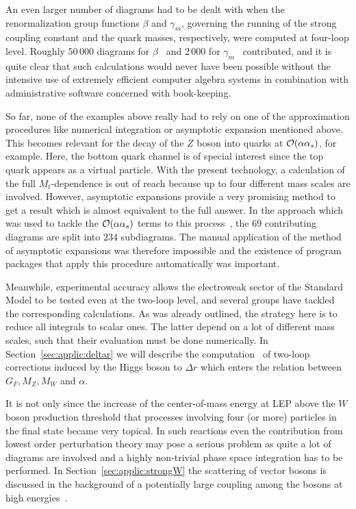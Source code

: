 An even larger number of diagrams had to be dealt with when the
renormalization group functions $\beta$ and $\gamma_m$, governing the
running of the strong coupling constant and the quark masses,
respectively, were computed at four-loop level.  Roughly $50\,000$
diagrams for $\beta$~\cite{RitVerLar97}
and $2\,000$ for 
$\gamma_m$~\cite{Che97VerLarRit97}
contributed, and it is
quite clear that such calculations would never have been possible
without the intensive use of extremely efficient computer algebra
systems in combination with administrative software concerned with
book-keeping.

So far, none of the examples above really had to rely on one of the
approximation procedures like numerical integration or asymptotic
expansion mentioned above. This becomes relevant for the decay of the
$Z$ boson into quarks at ${\cal O}(\alpha\alpha_s)$, for example. Here,
the bottom quark channel is of special interest since the top quark
appears as a virtual particle.  With the present technology, a
calculation of the full $M_t$-dependence is out of reach because up to
four different mass scales are involved.  However, asymptotic expansions
provide a very promising method to get a result which is almost
equivalent to the full answer. In the approach which was used to tackle
the ${\cal O}(\alpha\alpha_s)$ terms to this process~\cite{HarSeiSte97},
the 69 contributing diagrams are split into 234 subdiagrams.  The manual
application of the method of asymptotic expansions was therefore
impossible and the existence of program packages that apply this
procedure automatically was important.

Meanwhile, experimental accuracy allows the electroweak sector of the
Standard Model to be tested even at the two-loop level, and several
groups have tackled the corresponding calculations.  As was already
outlined, the strategy here is to reduce all integrals to scalar ones.
The latter depend on a lot of different mass scales, such that their
evaluation must be done numerically.  In Section~\ref{sec:applic:deltar}
we will describe the computation~\cite{BauWei97} of two-loop corrections
induced by the Higgs boson to $\Delta r$ which enters the relation
between $G_F, M_Z, M_W$ and $\alpha$.

It is not only since the increase of the center-of-mass energy at LEP
above the $W$ boson production threshold that processes involving four
(or more) particles in the final state became very topical.  In such
reactions even the contribution from lowest order perturbation theory may
pose a serious problem as quite a lot of diagrams are involved and a
highly non-trivial phase space integration has to be performed. In
Section~\ref{sec:applic:strongW} the scattering of vector bosons 
is discussed in the background of a potentially large coupling among the
bosons at high energies~\cite{BHKPYZ98}.

